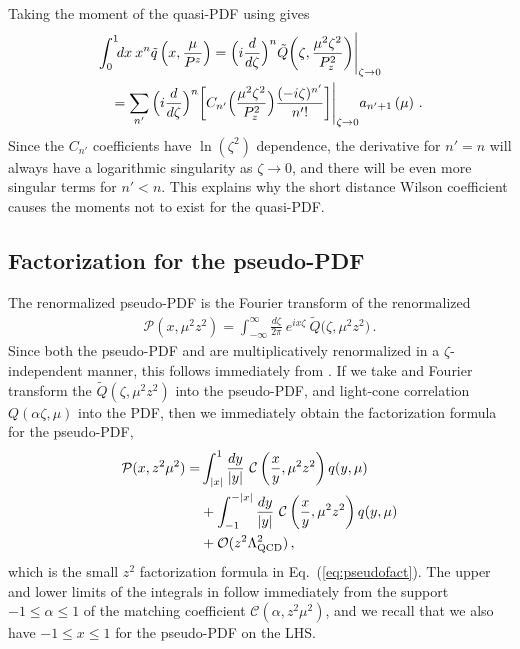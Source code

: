 Taking the moment of the quasi-PDF using  gives
\begin{align} \label{eq:momentqpdf}
 &\int_0^1\!\! dx\: x^n \tilde{q} \left( x, \frac{\mu}{P^z}\right)
= \Big(i\frac{d}{d\zeta}\Big)^n \tilde{Q} \biggl(\zeta, \frac{{\mu}^2\zeta^2}{P_z^2}\biggr) \Bigg|_{\zeta\to 0}
 \\
& \quad =  \sum_{n'}  \Big(i\frac{d}{d\zeta}\Big)^n \bigg[ C_{n'} \Big(\frac{{\mu}^2 \zeta^2}{P_z^2}\Big)  \frac{(-i \zeta)^{n'}}{n'!} \bigg] \Bigg|_{\zeta\to 0}  a_{n' + 1}
\left(\mu\right) \,.  \nonumber
\end{align}
Since the $C_{n'}$ coefficients have $\ln(\zeta^2)$ dependence, the derivative for $n'=n$ will always have a logarithmic singularity as $\zeta\to 0$, and there will be even more singular terms for $n'<n$. This explains why the short distance Wilson coefficient causes the moments not to exist for the quasi-PDF.


\subsection{Factorization for the pseudo-PDF}

The renormalized pseudo-PDF is the Fourier transform of the renormalized \spcorr
\begin{align} \label{eq:pseudoRen}
\mathcal{P} \left( x, \mu^2 z^2\right)
   = \int_{-\infty}^\infty \! \frac{d \zeta}{2\pi}\:
    e^{ix \zeta}\: \tilde{Q}\bigl( \zeta, \mu^2 z^2 \bigr)
   \,.
\end{align}
Since both the pseudo-PDF and \spcorr are multiplicatively renormalized in a $\zeta$-independent manner, this follows immediately from .
If we take  and Fourier transform the \spcorr $\tilde Q(\zeta,\mu^2z^2)$ into the pseudo-PDF, and light-cone correlation $Q(\alpha\zeta,\mu)$ into the PDF, then we immediately obtain the factorization formula for the pseudo-PDF,
\begin{align}\label{eq:ps-q-fact}
\mathcal{P}(x,z^2\mu^2) =
 &\int_{|x|}^1 {dy\over |y|}\
  \mathcal{C}\left({x\over y},\mu^2 z^2\right) q(y,\mu)\\
&+\int^{-|x|}_{-1} {dy\over |y|}\
  \mathcal{C}\left( \frac{x}{y}, \mu^2z^2\right) q(y,\mu)
  \nonumber \\
 &+ {\cal O}(z^2\Lambda_{\rm QCD}^2)\,,\nonumber
\end{align}
which is the small $z^2$ factorization formula in Eq.~(\ref{eq:pseudofact}). The upper and lower limits of the integrals in  follow immediately from the support $-1\le \alpha \le 1$ of the matching coefficient $\mathcal{C}(\alpha,z^2\mu^2)$, and we recall that we also have $-1\le x\le 1$ for the pseudo-PDF on the LHS.

